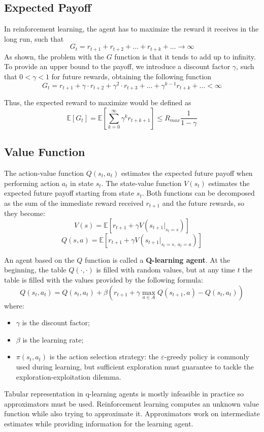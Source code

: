 \documentclass{article}
\begin{document}
\subsection{Expected Payoff}
In reinforcement learning, the agent has to maximize the reward it receives in the long run, such that
\[G_t = r_{t+1} + r_{t+2} + ... + r_{t+k} + ... \to \infty\]
As shown, the problem with the $G$ function is that it tends to add up to infinity. To provide an upper bound to the payoff, we introduce a discount factor $\gamma$, such that $0 < \gamma < 1$ for future rewards, obtaining the following function
\[G_t = r_{t+1} + \gamma \cdot r_{t+2} + \gamma^2 \cdot r_{t+3} + ... + \gamma^{k-1} r_{t+k} + ... < \infty \]

Thus, the expected reward to maximize would be defined as
\[\mathbb{E}[G_t] = \mathbb{E}\left[\sum_{k=0}^{\infty}\gamma^k r_{t+k+1}\right] \le R_{max}\frac{1}{1-\gamma}\]

\subsection{Value Function}
The action-value function $Q(s_t, a_t)$ estimates the expected future payoff when performing action $a_t$ in state $s_t$. The state-value function $V(s_t)$ estimates the expected future payoff starting from state $s_t$. Both functions can be decomposed as the sum of the immediate reward received $r_{t+1}$ and the future rewards, so they become:
\[V(s) = \mathbb{E}[r_{t+1}+\gamma V(s_{t+1}|_{s_t=s})]\]
\[Q(s,a) = \mathbb{E}[r_{t+1}+\gamma  V(s_{t+1}|_{s_t =s,\; a_t = a})]\]

An agent based on the $Q$ function is called a \textbf{Q-learning agent}. At the beginning, the table $Q(\cdot, \cdot)$ is filled with random values, but at any time $t$ the table is filled with the values provided by the following formula:
\[Q(s_t, a_t) = Q(s_t, a_t) + \beta(r_{t+1} + \gamma  \max_{a\in A}Q(s_{t+1}, a) - Q(s_t, a_t)) \]
where:
\begin{itemize}
    \item $\gamma$ is the discount factor;
    \item $\beta$ is the learning rate;
    \item $\pi(s_t, a_t)$ is the action selection strategy: the $\varepsilon$-greedy policy is commonly used during learning, but sufficient exploration must guarantee to tackle the exploration-exploitation dilemma.
\end{itemize}

Tabular representation in q-learning agents is mostly infeasible in practice so approximators must be used. Reinforcement learning computes an unknown value function while also trying to approximate it. Approximators work on intermediate estimates while providing information for the learning agent.
\end{document}
